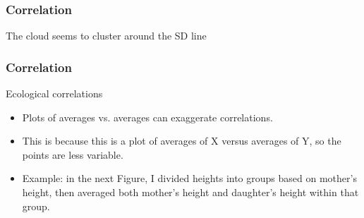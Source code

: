 \documentclass[handout]{beamer}
\begin{document}
   \begin{frame}
   \frametitle{Correlation}
   \begin{center}
   \end{center}
   The cloud seems to cluster around the SD line
   \end{frame}


   \begin{frame} \frametitle{Correlation}

   \begin{block}
   {Ecological correlations}
   \begin{itemize}
   \item Plots of averages vs. averages can exaggerate correlations.
   \item This is because this is a plot of averages of X versus averages of Y, so the points are less variable.
   \item Example: in the next Figure, I divided heights into groups based on mother's height, then averaged both mother's height and daughter's height within that group.
   \end{itemize}
   \end{block}
   \end{frame}

\end{document}
